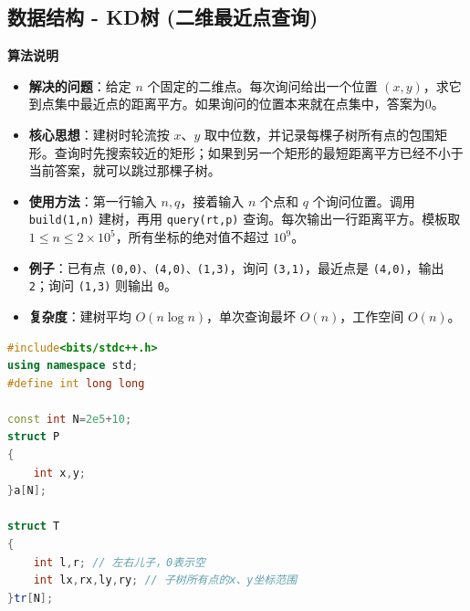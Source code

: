 \documentclass[10pt,landscape,a4paper]{article}
\begin{document}
\begin{multicols*}{3}
\subsection*{数据结构 - KD树 (二维最近点查询)}
\par\addvspace{0.7ex}\noindent\textbf{算法说明}\par\nobreak
\begin{itemize}
\item \textbf{解决的问题}：给定 $n$ 个固定的二维点。每次询问给出一个位置 $(x,y)$，求它到点集中最近点的距离平方。如果询问的位置本来就在点集中，答案为0。
\item \textbf{核心思想}：建树时轮流按 $x$、$y$ 取中位数，并记录每棵子树所有点的包围矩形。查询时先搜索较近的矩形；如果到另一个矩形的最短距离平方已经不小于当前答案，就可以跳过那棵子树。
\item \textbf{使用方法}：第一行输入 $n,q$，接着输入 $n$ 个点和 $q$ 个询问位置。调用 \texttt{b\allowbreak{}u\allowbreak{}i\allowbreak{}l\allowbreak{}d\allowbreak{}(\allowbreak{}1\allowbreak{},\allowbreak{}n\allowbreak{})} 建树，再用 \texttt{q\allowbreak{}u\allowbreak{}e\allowbreak{}r\allowbreak{}y\allowbreak{}(\allowbreak{}r\allowbreak{}t\allowbreak{},\allowbreak{}p\allowbreak{})} 查询。每次输出一行距离平方。模板取 $1\le n\le 2\times 10^5$，所有坐标的绝对值不超过 $10^9$。
\item \textbf{例子}：已有点 \texttt{(\allowbreak{}0\allowbreak{},\allowbreak{}0\allowbreak{})\allowbreak{}、\allowbreak{}(\allowbreak{}4\allowbreak{},\allowbreak{}0\allowbreak{})\allowbreak{}、\allowbreak{}(\allowbreak{}1\allowbreak{},\allowbreak{}3\allowbreak{})}，询问 \texttt{(\allowbreak{}3\allowbreak{},\allowbreak{}1\allowbreak{})}，最近点是 \texttt{(\allowbreak{}4\allowbreak{},\allowbreak{}0\allowbreak{})}，输出 \texttt{2}；询问 \texttt{(\allowbreak{}1\allowbreak{},\allowbreak{}3\allowbreak{})} 则输出 \texttt{0}。
\item \textbf{复杂度}：建树平均 $O(n\log n)$，单次查询最坏 $O(n)$，工作空间 $O(n)$。
\end{itemize}
\par{}\par
\begin{lstlisting}[language=C++]
#include<bits/stdc++.h>
using namespace std;
#define int long long

const int N=2e5+10;
struct P
{
    int x,y;
}a[N];

struct T
{
    int l,r; // 左右儿子，0表示空
    int lx,rx,ly,ry; // 子树所有点的x、y坐标范围
}tr[N];


\end{lstlisting}
\end{multicols*}
\end{document}
